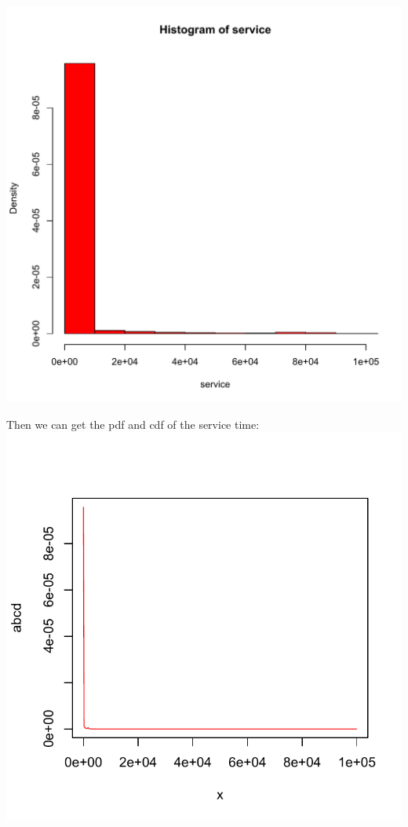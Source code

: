 \documentclass[11pt]{article}
\begin{document}
\begin{center}
\includegraphics[scale=0.36]{trace1_service2.pdf}
\end{center}
Then we can get the pdf and cdf of the service time: \\
\includegraphics[scale=0.5]{trace1_2_pdf.pdf}
\end{document}
